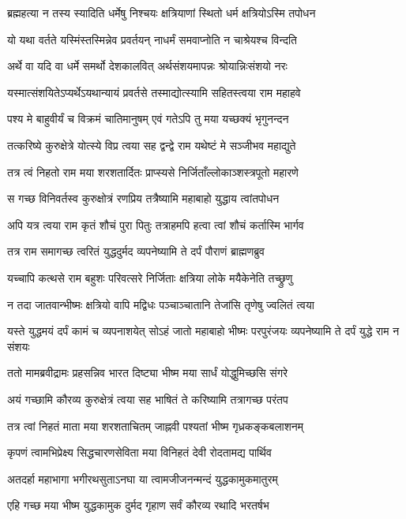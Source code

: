 \twolineshloka
{ब्रह्महत्या न तस्य स्यादिति धर्मेषु निश्चयः}
{क्षत्रियाणां स्थितो धर्म क्षत्रियोऽस्मि तपोधन}


\twolineshloka
{यो यथा वर्तते यस्मिंस्तस्मिन्नेव प्रवर्तयन्}
{नाधर्मं समवाप्नोति न चाश्रेयश्च विन्दति}


\twolineshloka
{अर्थे वा यदि वा धर्मे समर्थो देशकालवित्}
{अर्थसंशयमापन्नः श्रोयान्निःसंशयो नरः}


\twolineshloka
{यस्मात्संशयितेऽप्यर्थेऽयथान्यायं प्रवर्तसे}
{तस्माद्योत्स्यामि सहितस्त्वया राम महाहवे}


\twolineshloka
{पश्य मे बाहुवीर्यं च विक्रमं चातिमानुषम्}
{एवं गतेऽपि तु मया यच्छक्यं भृगुनन्दन}


\twolineshloka
{तत्करिष्ये कुरुक्षेत्रे योत्स्ये विप्र त्वया सह}
{द्वन्द्वे राम यथेष्टं मे सञ्जीभव महाद्युते}


\twolineshloka
{तत्र त्वं निहतो राम मया शरशतार्दितः}
{प्राप्स्यसे निर्जिताँल्लोकाञ्शस्त्रपूतो महारणे}


\twolineshloka
{स गच्छ विनिवर्तस्व कुरुक्षोत्रं रणप्रिय}
{तत्रैष्यामि महाबाहो युद्धाय त्वांतपोधन}


\twolineshloka
{अपि यत्र त्वया राम कृतं शौचं पुरा पितुः}
{तत्राहमपि हत्वा त्वां शौचं कर्तास्मि भार्गव}


\twolineshloka
{तत्र राम समागच्छ त्वरितं युद्धदुर्मद}
{व्यपनेष्यामि ते दर्पं पौराणं ब्राह्मणब्रुव}


\twolineshloka
{यच्चापि कत्थसे राम बहुशः परिवत्सरे}
{निर्जिताः क्षत्रिया लोके मयैकेनेति तच्छ्रुणु}


\twolineshloka
{न तदा जातवान्भीष्मः क्षत्रियो वापि मद्विधः}
{पञ्चाञ्चातानि तेजांसि तृणेषु ज्वलितं त्वया}


\threelineshloka
{यस्ते युद्धमयं दर्पं कामं च व्यपनाशयेत्}
{सोऽहं जातो महाबाहो भीष्मः परपुरंजयः}
{व्यपनेष्यामि ते दर्पं युद्धे राम न संशयः}


\twolineshloka
{ततो मामब्रवीद्रामः प्रहसन्निव भारत}
{दिष्ट्या भीष्म मया सार्धं योद्धुमिच्छसि संगरे}


\twolineshloka
{अयं गच्छामि कौरव्य कुरुक्षेत्रं त्वया सह}
{भाषितं ते करिष्यामि तत्रागच्छ परंतप}


\twolineshloka
{तत्र त्वां निहतं माता मया शरशताचितम्}
{जाह्नवी पश्यतां भीष्म गृध्रकङ्कबलाशनम्}


\twolineshloka
{कृपणं त्वामभिप्रेक्ष्य सिद्धचारणसेविता}
{मया विनिहतं देवी रोदतामद्य पार्थिव}


\twolineshloka
{अतदर्हा महाभागा भगीरथसुताऽनघा}
{या त्वामजीजनन्मन्दं युद्धकामुकमातुरम्}


\twolineshloka
{एहि गच्छ मया भीष्म युद्धकामुक दुर्मद}
{गृहाण सर्वं कौरव्य रथादि भरतर्षभ}


